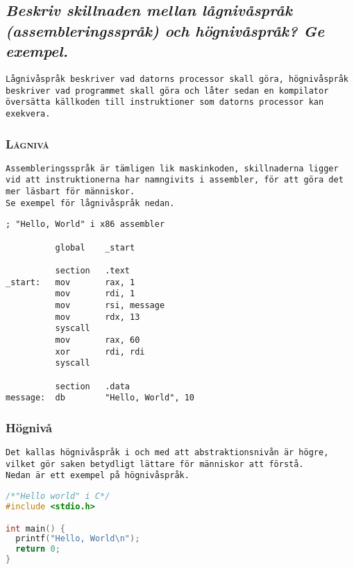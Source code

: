 \documentclass[../main.tex]{subfiles}
\begin{document}
\subsection{\textit{Beskriv skillnaden mellan lågnivåspråk (assembleringsspråk) och högnivåspråk? Ge exempel.}}

\texttt{Lågnivåspråk beskriver vad datorns processor skall göra, högnivåspråk beskriver vad programmet skall göra och låter sedan en kompilator översätta källkoden till instruktioner som datorns processor kan exekvera.}\\
\subsubsection{\textsc{Lågnivå}}
\texttt{Assembleringsspråk är tämligen lik maskinkoden, skillnaderna ligger vid att instruktionerna har namngivits i assembler, för att göra det mer läsbart för människor.\\ Se exempel för lågnivåspråk nedan.}


\begin{lstlisting}
; "Hello, World" i x86 assembler 

          global    _start

          section   .text
_start:   mov       rax, 1                  
          mov       rdi, 1                  
          mov       rsi, message            
          mov       rdx, 13                 
          syscall                           
          mov       rax, 60                 
          xor       rdi, rdi                
          syscall                           

          section   .data
message:  db        "Hello, World", 10   
\end{lstlisting}

\subsubsection{Högnivå}
\texttt{Det kallas högnivåspråk i och med att abstraktionsnivån är högre, vilket gör saken betydligt lättare för människor att förstå. \\Nedan är ett exempel på högnivåspråk.}

\begin{lstlisting}[language=c]
/*"Hello world" i C*/
#include <stdio.h>

int main() {
  printf("Hello, World\n");
  return 0;
}
\end{lstlisting}
\end{document}
